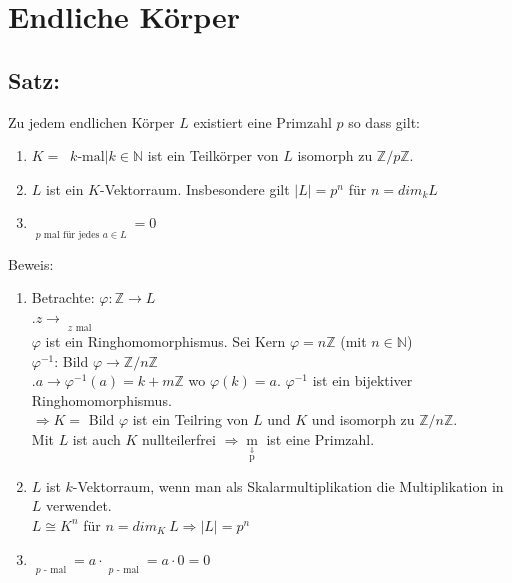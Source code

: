 \section{Endliche Körper}
%
%
%
\subsection{Satz:}
Zu jedem endlichen Körper $L$ existiert eine Primzahl $p$ so dass gilt:
\begin{enumerate}[label={(\alph*)}]
	\item $K = \mathop{\underbrace{\{1+1+ \dotsc +1\}}}\limits{k\text{-mal}}|k \in \mathbb{N}$ ist ein Teilkörper von $L$ 
		isomorph zu $\mathbb{Z}/p\mathbb{Z}$.
	\item $L$ ist ein $K$-Vektorraum. Insbesondere gilt $|L| = p^{n}$ für $n = dim_{k}L$
	\item $\mathop{\underbrace{a+ \dotsc +a}}\limits_{p\text{ mal für jedes } a \in L} = 0$
\end{enumerate}
Beweis:
\begin{enumerate}[label={(\alph*)}]
	\item Betrachte: $\varphi :\mathbb{Z} \rightarrow L$\\
				.\qquad \quad \qquad $z \rightarrow \mathop{\underbrace{1+ \dotsc + 1}}\limits_{z\text{ mal}}$\\
				$\varphi$ ist ein Ringhomomorphismus. Sei Kern $\varphi = n \mathbb{Z}$ (mit $n\in\mathbb{N}$)\\
				$\varphi^{-1}$: Bild $\varphi \rightarrow \mathbb{Z}/n\mathbb{Z}$\\
				.\qquad \qquad $a \rightarrow \varphi^{-1}(a)=k+m\mathbb{Z}$ wo $\varphi(k)=a$.
				$\varphi^{-1}$ ist ein bijektiver Ringhomomorphismus. \\
				$\Rightarrow K =$ Bild $\varphi$ ist ein Teilring von $L$ und $K$ und isomorph zu 
				$\mathbb{Z}/n\mathbb{Z}$.\\
				Mit $L$ ist auch $K$ nullteilerfrei $\Rightarrow \mathop{m}\limits_{\mathop{p}\limits^{\Downarrow}}$ 
				ist eine Primzahl.
	\item $L$ ist $k$-Vektorraum, wenn man als Skalarmultiplikation die Multiplikation in $L$ verwendet. \\
		$L \cong K^{n}$ für $n=dim_{K} \ L\Rightarrow |L|=p^{n}$
	\item $\mathop{\underbrace{a+\dotsc + a}}\limits_{p\text{ - mal}}= a \cdot \mathop{\underbrace{(1+ \dotsc 
		+1)}}\limits_{p\text{ - mal}} = a \cdot 0 = 0$
\end{enumerate}
%
%
%
